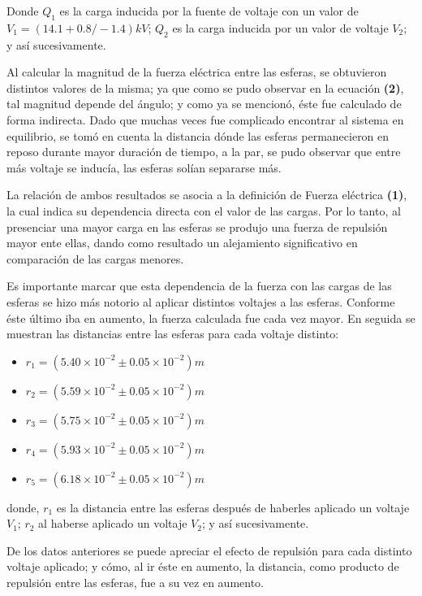 \documentclass[letterpaper, 11 pt]{article}
\begin{document}
\begin{multicols*}{2}
Donde $Q_1$ es la carga inducida por la fuente de voltaje con un valor de $V_1=(14.1 +0.8/-1.4) kV$; $Q_2$ es la carga inducida por un valor de voltaje $V_2$; y así sucesivamente.  



Al calcular la magnitud de la fuerza eléctrica entre las esferas, se obtuvieron distintos valores de la misma; ya que como se pudo observar en la ecuación \textbf{(2)}, tal magnitud depende del ángulo; y como ya se mencionó, éste fue calculado de forma indirecta. Dado que muchas veces fue complicado encontrar al sistema en equilibrio, se tomó en cuenta la distancia dónde las esferas permanecieron en reposo durante mayor duración de tiempo, a la par, se pudo observar que entre más voltaje se inducía, las esferas solían separarse más.

La relación de ambos resultados se asocia a la definición de Fuerza eléctrica \textbf{(1)}, la cual indica su dependencia directa con el valor de las cargas. Por lo tanto, al presenciar una mayor carga en las esferas se produjo una fuerza de repulsión mayor ente ellas, dando como resultado un alejamiento significativo en comparación de las cargas menores. 

Es importante marcar que esta dependencia de la fuerza con las cargas de las esferas se hizo más notorio al aplicar distintos voltajes a las esferas. Conforme éste último iba en aumento, la fuerza calculada fue cada vez mayor. 
En seguida se muestran las distancias entre las esferas para cada voltaje distinto:

\begin{itemize}
\item $r_1= (5.40\times 10^{-2}\pm0.05\times 10^{-2} )m$
\item $r_2= (5.59\times 10^{-2}\pm0.05\times 10^{-2} )m$
\item $r_3= (5.75\times 10^{-2}\pm0.05\times 10^{-2} )m$
\item $r_4= (5.93\times 10^{-2}\pm0.05\times 10^{-2} )m$
\item $r_5= (6.18\times 10^{-2}\pm0.05\times 10^{-2} )m$
\end{itemize}

donde, $r_1$ es la distancia entre las esferas después de haberles aplicado un voltaje $V_1$; $r_2$ al haberse aplicado un voltaje $V_2$; y así sucesivamente. 

De los datos anteriores se puede apreciar el efecto de repulsión para cada distinto voltaje aplicado; y cómo, al ir éste en aumento, la distancia, como producto de repulsión entre las esferas, fue a su vez en aumento.


\end{multicols*}
\end{document}
